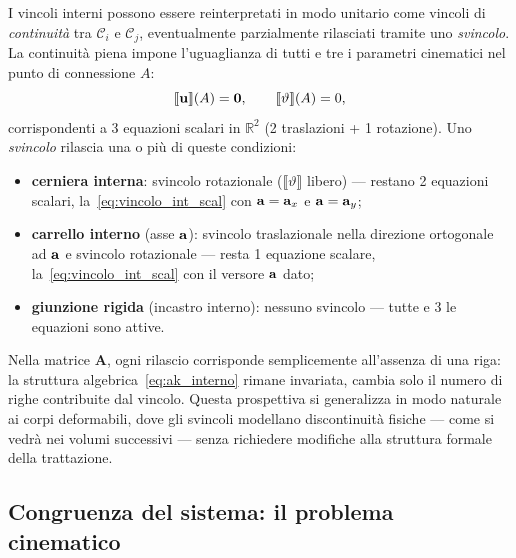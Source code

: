 \begin{oss}
	I vincoli interni possono essere reinterpretati in modo
	unitario come vincoli di \emph{continuità} tra
	$\mathcal{C}_i$ e $\mathcal{C}_j$, eventualmente
	parzialmente rilasciati tramite uno \emph{svincolo}.
	La continuità piena impone l'uguaglianza di tutti e tre
	i parametri cinematici nel punto di connessione $A$:
	\begin{equation}\label{eq:continuita_piena}
		\llbracket\mathbf{u}\rrbracket(A) = \bm{0}, \qquad
		\llbracket\vartheta\rrbracket(A) = 0,
	\end{equation}
	corrispondenti a 3 equazioni scalari in $\mathbb{R}^2$
	(2 traslazioni + 1 rotazione). Uno \emph{svincolo}
	rilascia una o più di queste condizioni:
	\begin{itemize}[noitemsep]
		\item \textbf{cerniera interna}: svincolo rotazionale
		($\llbracket\vartheta\rrbracket$ libero) --- restano 2 equazioni
		scalari, la~\eqref{eq:vincolo_int_scal} con
		$\mathbf{a} = \mathbf{a}_x$ e $\mathbf{a} = \mathbf{a}_y$;
		\item \textbf{carrello interno} (asse $\mathbf{a}$): svincolo
		traslazionale nella direzione ortogonale ad $\mathbf{a}$ e
		svincolo rotazionale --- resta 1 equazione scalare,
		la~\eqref{eq:vincolo_int_scal} con il versore $\mathbf{a}$
		dato;
		\item \textbf{giunzione rigida} (incastro interno): nessuno svincolo ---
		tutte e 3 le equazioni sono attive.
	\end{itemize}
	Nella matrice $\bm{A}$, ogni rilascio corrisponde
	semplicemente all'assenza di una riga: la struttura
	algebrica~\eqref{eq:ak_interno} rimane invariata,
	cambia solo il numero di righe contribuite dal vincolo.
	Questa prospettiva si generalizza in modo naturale ai
	corpi deformabili, dove gli svincoli modellano
	discontinuità fisiche --- come si vedrà nei volumi
	successivi --- senza richiedere modifiche alla struttura
	formale della trattazione.
\end{oss}






\subsection{Congruenza del sistema: il problema cinematico}
\label{sec:prob_cin}

